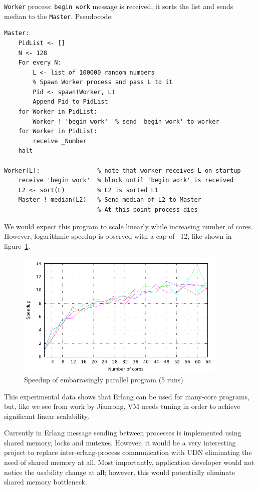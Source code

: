 \documentclass[english,11pt]{article}
\begin{document}
{\tt Worker} process: {\tt begin work} message is received, it sorts the list
and sends median to the {\tt Master}. Pseudocode:

\begin{verbatim}
Master:
    PidList <- []
    N <- 128
    For every N:
        L <- list of 100000 random numbers
        % Spawn Worker process and pass L to it
        Pid <- spawn(Worker, L)
        Append Pid to PidList
    for Worker in PidList:
        Worker ! 'begin work'  % send 'begin work' to worker
    for Worker in PidList:
        receive _Number
    halt

Worker(L):                % note that worker receives L on startup
    receive 'begin work'  % block until 'begin work' is received
    L2 <- sort(L)         % L2 is sorted L1
    Master ! median(L2)   % Send median of L2 to Master
                          % At this point process dies
\end{verbatim}

We would expect this program to scale linearly while increasing number of
cores. However, logarithmic speedup is observed with a cap of ~12, like shown
in figure~\ref{fig:parallel_speedup}.

\begin{figure}
    \centering
    \includegraphics[width=0.9\textwidth]{parallel_speedup.pdf}
    \caption{Speedup of embarrasingly parallel program (5 runs)}
    \label{fig:parallel_speedup}
\end{figure}

This experimental data shows that Erlang can be used for many-core programs,
but, like we see from work by Jianrong\cite{erlang-manycore-scalability}, VM
needs tuning in order to achieve significant linear scalability.

Currently in Erlang message sending between processes is implemented using
shared memory, locks and mutexes. However, it would be a very interesting
project to replace inter-erlang-process communication with UDN eliminating the
need of shared memory at all. Most importantly, application developer would not
notice the usability change at all; however, this would potentially eliminate
shared memory bottleneck.
\end{document}
